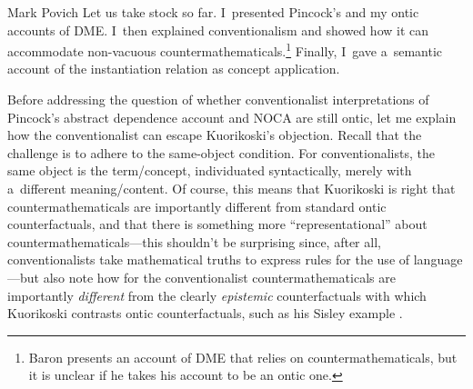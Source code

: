 \begin{artengenv}{Mark Povich}
Let us take stock so far. I~presented Pincock's
\parencite*[][]{pincock_abstract_2015} %
 and my 
\parencite[][]{craver_constitutive_2021} %
 ontic accounts of DME. I~then explained conventionalism and showed how it can accommodate non-vacuous countermathematicals.\footnote{Baron 
\parencite*[][]{baron_counterfactual_2020} %
 presents an account of DME that relies on countermathematicals, but it is unclear if he takes his account to be an ontic one. } Finally, I~gave a~semantic account of the instantiation relation as concept application.

Before addressing the question of whether conventionalist interpretations of Pincock's abstract dependence account and NOCA are still ontic, let me explain how the conventionalist can escape Kuorikoski's objection. Recall that the challenge is to adhere to the same-object condition. For conventionalists, the same object is the term/concept, individuated syntactically, merely with a~different meaning/content. Of course, this means that Kuorikoski is right that countermathematicals are importantly different from standard ontic counterfactuals, and that there is something more ``representational'' about countermathematicals---this shouldn't be surprising since, after all, conventionalists take mathematical truths to express rules for the use of language---but also note how for the conventionalist countermathematicals are importantly \textit{different} from the clearly \textit{epistemic} counterfactuals with which Kuorikoski contrasts ontic counterfactuals, such as his Sisley example
\parencite[][p.196]{kuorikoski_there_2021}. %

\end{artengenv}
